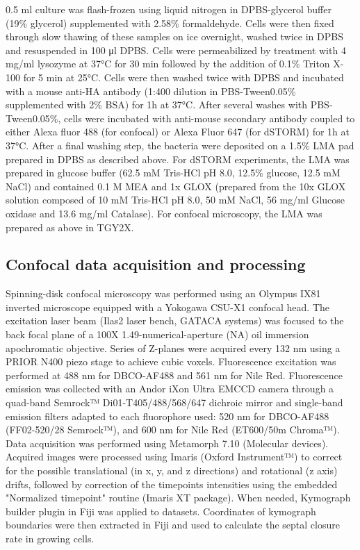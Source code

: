 0.5 ml culture was flash-frozen using liquid nitrogen in DPBS-glycerol buffer (19\% glycerol) supplemented with 2.58\% formaldehyde.
Cells were then fixed through slow thawing of these samples on ice overnight, washed twice in DPBS and resuspended in 100 μl DPBS.
Cells were permeabilized by treatment with 4 mg/ml lysozyme at 37°C for 30 min followed by the addition of 0.1\% Triton X-100 for 5 min at 25°C.
Cells were then washed twice with DPBS and incubated with a mouse anti-HA antibody (1:400 dilution in PBS-Tween0.05\% supplemented with 2\% BSA) for 1h at 37°C.
After several washes with PBS-Tween0.05\%, cells were incubated with anti-mouse secondary antibody coupled to either Alexa fluor 488 (for confocal) or Alexa Fluor 647 (for dSTORM) for 1h at 37°C.
After a final washing step, the bacteria were deposited on a 1.5\% LMA pad prepared in DPBS as described above.
For dSTORM experiments, the LMA was prepared in glucose buffer (62.5 mM Tris-HCl pH 8.0, 12.5\% glucose, 12.5 mM NaCl) and contained 0.1 M MEA and 1x GLOX (prepared from the 10x GLOX solution composed of 10 mM Tris-HCl pH 8.0, 50 mM NaCl, 56 mg/ml Glucose oxidase and 13.6 mg/ml Catalase).
For confocal microscopy, the LMA was prepared as above in TGY2X.

\subsection{Confocal data acquisition and processing}

Spinning-disk confocal microscopy was performed using an Olympus IX81 inverted microscope equipped with a Yokogawa CSU-X1 confocal head.
The excitation laser beam (Ilas2 laser bench, GATACA systems) was focused to the back focal plane of a 100X 1.49-numerical-aperture (NA) oil immersion apochromatic objective.
Series of Z-planes were acquired every 132 nm using a PRIOR N400 piezo stage to achieve cubic voxels.
Fluorescence excitation was performed at 488 nm for DBCO-AF488 and 561 nm for Nile Red.
Fluorescence emission was collected with an Andor iXon Ultra EMCCD camera through a quad-band Semrock™ Di01-T405/488/568/647 dichroic mirror and single-band emission filters adapted to each fluorophore used: 520 nm for DBCO-AF488 (FF02-520/28 Semrock™), and 600 nm for Nile Red (ET600/50m Chroma™).
Data acquisition was performed using Metamorph 7.10 (Molecular devices).
Acquired images were processed using Imaris (Oxford Instrument™) to correct for the possible translational (in x, y, and z directions) and rotational (z axis) drifts, followed by correction of the timepoints intensities using the embedded "Normalized timepoint" routine (Imaris XT package).
When needed, Kymograph builder plugin in Fiji was applied to datasets.
Coordinates of kymograph boundaries were then extracted in Fiji and used to calculate the septal closure rate in growing cells.

